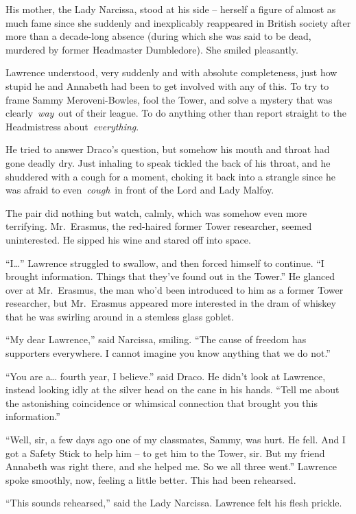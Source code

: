 His mother, the Lady Narcissa, stood at his side -- herself a figure of
almost as much fame since she suddenly and inexplicably reappeared in
British society after more than a decade-long absence (during which she
was said to be dead, murdered by former Headmaster Dumbledore). She
smiled pleasantly.

Lawrence understood, very suddenly and with absolute completeness, just
how stupid he and Annabeth had been to get involved with any of this. To
try to frame Sammy Meroveni-Bowles, fool the Tower, and solve a mystery
that was clearly~\emph{way}~out of their league. To do anything other
than report straight to the Headmistress about~\emph{everything}.

He tried to answer Draco's question, but somehow his mouth and throat
had gone deadly dry. Just inhaling to speak tickled the back of his
throat, and he shuddered with a cough for a moment, choking it back into
a strangle since he was afraid to even~\emph{cough}~in front of the Lord
and Lady Malfoy.

The pair did nothing but watch, calmly, which was somehow even more
terrifying. Mr.~Erasmus, the red-haired former Tower researcher, seemed
uninterested. He sipped his wine and stared off into space.

``I\ldots{}'' Lawrence struggled to swallow, and then forced himself to
continue. ``I brought information. Things that they've found out in the
Tower.'' He glanced over at Mr.~Erasmus, the man who'd been introduced
to him as a former Tower researcher, but Mr.~Erasmus appeared more
interested in the dram of whiskey that he was swirling around in a
stemless glass goblet.

``My dear Lawrence,'' said Narcissa, smiling. ``The cause of freedom has
supporters everywhere. I cannot imagine you know anything that we do
not.''

``You are a\ldots{} fourth year, I believe.'' said Draco. He didn't look
at Lawrence, instead looking idly at the silver head on the cane in his
hands. ``Tell me about the astonishing coincidence or whimsical
connection that brought you this information.''

``Well, sir, a few days ago one of my classmates, Sammy, was hurt. He
fell. And I got a Safety Stick to help him -- to get him to the Tower,
sir. But my friend Annabeth was right there, and she helped me. So we
all three went.'' Lawrence spoke smoothly, now, feeling a little better.
This had been rehearsed.

``This sounds rehearsed,'' said the Lady Narcissa. Lawrence felt his
flesh prickle.


